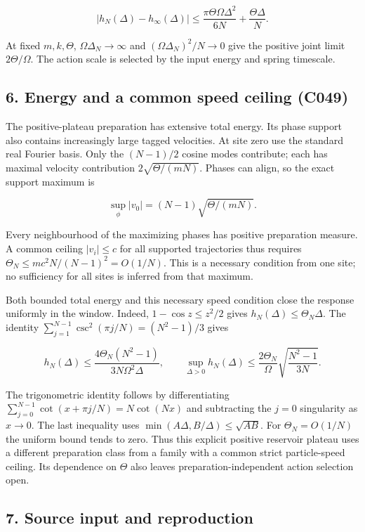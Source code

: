 \documentclass[11pt,a4paper]{article}
\begin{document}
\[
|h_N(\Delta)-h_\infty(\Delta)|
\le\frac{\pi\Theta\Omega\Delta^2}{6N}+\frac{\Theta\Delta}{N}.
\]

At fixed \(m,k,\Theta\), \(\Omega\Delta_N\to\infty\) and
\((\Omega\Delta_N)^2/N\to0\) give the positive joint limit
\(2\Theta/\Omega\). The action scale is selected by the input energy and
spring timescale.

\hypertarget{energy-and-a-common-speed-ceiling-c049}{%
\subsection{6. Energy and a common speed ceiling
(C049)}\label{energy-and-a-common-speed-ceiling-c049}}

The positive-plateau preparation has extensive total energy. Its phase
support also contains increasingly large tagged velocities. At site zero
use the standard real Fourier basis. Only the \((N-1)/2\) cosine modes
contribute; each has maximal velocity contribution
\(2\sqrt{\Theta/(mN)}\). Phases can align, so the exact support maximum
is

\[
\sup_{\phi}|v_0|=(N-1)\sqrt{\Theta/(mN)}.
\]

Every neighbourhood of the maximizing phases has positive preparation
measure. A common ceiling \(|v_i|\le c\) for all supported trajectories
thus requires \(\Theta_N\le mc^2N/(N-1)^2=O(1/N)\). This is a necessary
condition from one site; no sufficiency for all sites is inferred from
that maximum.

Both bounded total energy and this necessary speed condition close the
response uniformly in the window. Indeed, \(1-\cos z\le z^2/2\) gives
\(h_N(\Delta)\le\Theta_N\Delta\). The identity
\(\sum_{j=1}^{N-1}\csc^2(\pi j/N)=(N^2-1)/3\) gives

\[
h_N(\Delta)\le
\frac{4\Theta_N(N^2-1)}{3N\Omega^2\Delta},\qquad
\sup_{\Delta>0}h_N(\Delta)
\le\frac{2\Theta_N}{\Omega}\sqrt{\frac{N^2-1}{3N}}.
\]

The trigonometric identity follows by differentiating
\(\sum_{j=0}^{N-1}\cot(x+\pi j/N)=N\cot(Nx)\) and subtracting the
\(j=0\) singularity as \(x\to0\). The last inequality uses
\(\min(A\Delta,B/\Delta)\le\sqrt{AB}\). For \(\Theta_N=O(1/N)\) the
uniform bound tends to zero. Thus this explicit positive reservoir
plateau uses a different preparation class from a family with a common
strict particle-speed ceiling. Its dependence on \(\Theta\) also leaves
preparation-independent action selection open.

\hypertarget{source-input-and-reproduction}{%
\subsection{7. Source input and
reproduction}\label{source-input-and-reproduction}}
\end{document}

